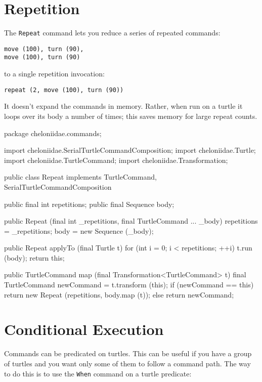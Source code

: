 \documentclass{report}
\begin{document}
\section {Repetition} \label{sec:repetition}
      The {\tt Repeat} command lets you reduce a series of repeated commands:

\begin{verbatim}
move (100), turn (90),
move (100), turn (90)
\end{verbatim}

      \noindent to a single repetition invocation:

\begin{verbatim}
repeat (2, move (100), turn (90))
\end{verbatim}

      It doesn't expand the commands in memory. Rather, when run on a turtle it loops over its body a number of times; this saves memory for large repeat
      counts.

\begin{javacode}
package cheloniidae.commands;

import cheloniidae.SerialTurtleCommandComposition;
import cheloniidae.Turtle;
import cheloniidae.TurtleCommand;
import cheloniidae.Transformation;

public class Repeat implements TurtleCommand, SerialTurtleCommandComposition {
  public final int      repetitions;
  public final Sequence body;

  public Repeat (final int _repetitions, final TurtleCommand ... _body)
    {repetitions = _repetitions; body = new Sequence (_body);}

  public Repeat applyTo (final Turtle t) {
    for (int i = 0; i < repetitions; ++i) t.run (body);
    return this;
  }

  public TurtleCommand map (final Transformation<TurtleCommand> t) {
    final TurtleCommand newCommand = t.transform (this);
    if (newCommand == this) return new Repeat (repetitions, body.map (t));
    else                    return newCommand;
  }
}
\end{javacode}

\section {Conditional Execution} \label{sec:conditional-execution}
      Commands can be predicated on turtles. This can be useful if you have a group of turtles and you want only some of them to follow a command path. The way
      to do this is to use the {\tt When} command on a turtle predicate:
\end{document}
